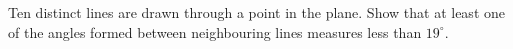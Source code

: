 Ten distinct lines are drawn through a point in the plane. Show that at least one of the angles formed between neighbouring lines measures less than $19^\circ$.
